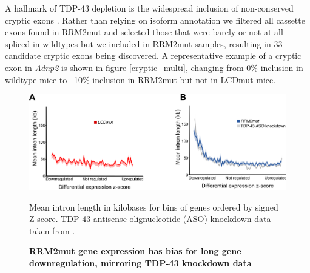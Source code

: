 A hallmark of TDP-43 depletion is the widespread inclusion of non-conserved cryptic exons \citep{Ling2015}. Rather than relying on isoform annotation we filtered all cassette exons found in RRM2mut and selected those that were barely or not at all spliced in wildtypes but we included in RRM2mut samples, resulting in 33 candidate cryptic exons being discovered. A representative example of a cryptic exon in \textit{Adnp2} is shown in figure \ref{cryptic_multi}, changing from 0\% inclusion in wildtype mice to ~10\% inclusion in RRM2mut but not in LCDmut mice.  

\begin{figure}[h!]
	\begin{center}
		\includegraphics[width=14cm]{Figures/05_tdp_mice/long_genes.png}
	\end{center}
	\caption{\textbf{RRM2mut gene expression has bias for long gene downregulation, mirroring TDP-43 knockdown data}}
	Mean intron length in kilobases for bins of genes ordered by signed Z-score. TDP-43 antisense olignucleotide (ASO) knockdown data taken from \cite{Polymenidou2011-hs}.
	\label{fig:long_genes}
\end{figure}

